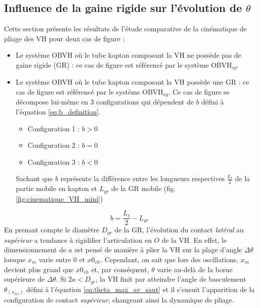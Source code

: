 \subsection{Influence de la gaine rigide sur l'évolution de $\theta$}
\label{subsec:4.3.3_Influence de la GR sur l evolution de theta}
Cette section présente les résultats de l'étude comparative de la cinématique de pliage des VH pour deux cas de figure :
\begin{itemize}[label=$\bullet$]
	\item Le système OBVH où le tube kapton composant la VH ne possède pas de gaine rigide (GR) : ce cas de figure est référencé par le système OBVH$_{sg}$.
	\item Le système OBVH où le tube kapton composant la VH possède une GR : ce cas de figure est référencé par le système OBVH$_{ag}$. Ce cas de figure se décompose lui-même en 3 configurations qui dépendent de $b$ défini à l'équation \ref{eq:b_definition}.
	      \begin{itemize}[label=$\circ$]
		      \item	Configuration 1 : $b > 0$
      		  \item Configuration 2 : $b = 0$
			  \item Configuration 3 : $b < 0$
	      \end{itemize}
	Sachant que $b$ représente la différence entre les longueurs respectives $\frac{L_t}{2}$ de la partie mobile en kapton et $L_{gr}$ de la GR mobile (fig. \ref{fig:cinematique_VH_mini})
\end{itemize}
\begin{equation}
	b = \dfrac{L_t}{2} - L_{gr}
	\label{eq:b_definition}
\end{equation}
En prenant compte le diamètre $D_{gr}$ de la GR, l'évolution du contact \emph{latéral} au \emph{supérieur} a tendance à rigidifier l'articulation en $O$ de la VH. En effet, le dimensionnement de $a$ est pensé de manière à plier la VH sur la plage d'angle $\Delta\theta$ lorsque $x_m$ varie entre 0 et $x0_{vh}$. Cependant, on sait que lors des oscillations, $x_m$ devient plus grand que $x0_{vh}$ et, par conséquent, $\theta$ varie au-delà de la borne supérieure de $\Delta\theta$. Si $2a<D_{gr}$, la VH finit par atteindre l'angle de basculement $\theta_(x_{ms})$ défini à l'équation \ref{eq:theta_max_av_saut} et il s'ensuit l'apparition de la configuration de contact \emph{supérieur}, changeant ainsi la dynamique de pliage.

